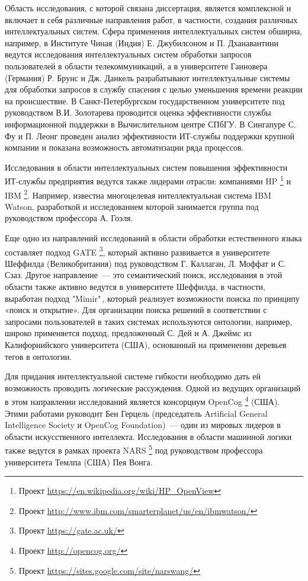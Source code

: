 Область исследования, с которой связана диссертация, является комплексной и включает в себя различные направления работ, в частности, создания различных интеллектуальных систем. Сфера применения интеллектуальных систем обширна, например, в Институте Чиная (Индия) Е. Джубилсоном и П. Дханавантини ведутся исследования интеллектуальных систем обработки запросов пользователей в области телекоммуникаций, а в университете Ганновера (Германия) Р. Брунс и Дж. Данкель разрабатывают интеллектуальные системы для обработки запросов в службу спасения с целью уменьшения времени реакции на происшествие. В Санкт-Петербургском государственном университете под руководством В.И. Золотарева проводится оценка эффективности службы информационной поддержки в Вычислительном центре СПбГУ. В Сингапуре С. Фу и П. Леонг проведен анализ эффективности ИТ-службы поддержки крупной компании и показана возможность автоматизации ряда процессов.\par
Исследования в области интеллектуальных систем повышения эффективности ИТ-службы предприятия ведутся также лидерами отрасли: компаниями HP \footnote{Проект \url{https://en.wikipedia.org/wiki/HP_OpenView}} и IBM \footnote{Проект \url{http://www.ibm.com/smarterplanet/us/en/ibmwatson/}}. Например, известна многоцелевая интеллектуальная система IBM Watson, разработкой и исследованием которой занимается группа под руководством профессора А. Гоэля.  \par   

Еще одно из направлений исследований в области обработки естественного языка составляет подход GATE \footnote{Проект \url{https://gate.ac.uk/}}, который активно развивается в университете Шеффилда (Великобритания) под руководством Г. Каллаган, Л. Моффат и С. Сзаз. Другое направление~--- это семантический поиск, исследования в этой области также активно ведутся в университете Шеффилда, в частности, выработан подход "Mimir"\,, который реализует возможности поиска по принципу «поиск и открытие». Для организации поиска решений в соответствии с запросами пользователей в таких системах используются онтологии, например, широко применяется подход, предложенный С. Дей и А. Джеймс из Калифорнийского университета (США), основанный на применении деревьев тегов в онтологии. \par
Для придания интеллектуальной системе гибкости необходимо дать ей возможность проводить логические рассуждения. Одной из ведущих организаций в этом направлении исследований является консорциум OpenCog \footnote{Проект \url{http://opencog.org/}} (США). Этими работами руководит Бен Герцель (председатель Artificial General Intelligence Society и OpenCog Foundation)~--- один из мировых лидеров в области искусственного интеллекта. Исследования в области машинной логики также ведутся в рамках проекта NARS \footnote{Проект \url{https://sites.google.com/site/narswang/}} под руководством профессора университета Темлпа (США) Пея Вонга. \par 

